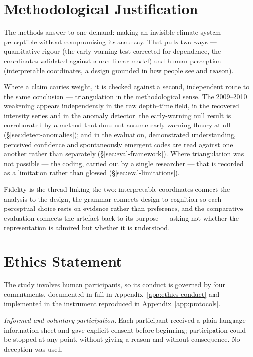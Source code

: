 \section{Methodological Justification}
\label{sec:justification}

The methods answer to one demand: making an invisible climate system perceptible without compromising its accuracy. That pulls two ways --- quantitative rigour (the early-warning test corrected for dependence, the coordinates validated against a non-linear model) and human perception (interpretable coordinates, a design grounded in how people see and reason).

Where a claim carries weight, it is checked against a second, independent route to the same conclusion --- triangulation in the methodological sense. The 2009--2010 weakening appears independently in the raw depth--time field, in the recovered intensity series and in the anomaly detector; the early-warning null result is corroborated by a method that does not assume early-warning theory at all (\S\ref{sec:detect-anomalies}); and in the evaluation, demonstrated understanding, perceived confidence and spontaneously emergent codes are read against one another rather than separately (\S\ref{sec:eval-framework}). Where triangulation was not possible --- the coding, carried out by a single researcher --- that is recorded as a limitation rather than glossed (\S\ref{sec:eval-limitations}).

Fidelity is the thread linking the two: interpretable coordinates connect the analysis to the design, the grammar connects design to cognition so each perceptual choice rests on evidence rather than preference, and the comparative evaluation connects the artefact back to its purpose --- asking not whether the representation is admired but whether it is understood.

\section{Ethics Statement}
\label{sec:ethics-statement}

The study involves human participants, so its conduct is governed by four commitments,
documented in full in Appendix~\ref{app:ethics-conduct} and implemented in the instrument
reproduced in Appendix~\ref{app:protocols}.

\emph{Informed and voluntary participation.} Each participant received a plain-language
information sheet and gave explicit consent before beginning; participation could be stopped
at any point, without giving a reason and without consequence. No deception was used.

